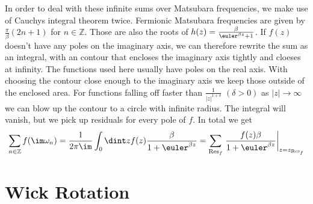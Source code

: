 \documentclass[a4paper,10pt]{report}
\begin{document}
In order to deal with these infinite sums over Matsubara frequencies, we make use of Cauchys integral theorem twice.
Fermionic Matsubara frequencies are given by $\frac{\pi}{\beta}(2n+1)$ for $n \in \mathbb{Z}$.
Those are also the roots of $h(z) = \frac{\beta}{\euler^{\beta z}+1}$.
If $f(z)$ doesn't have any poles on the imaginary axis, we can therefore rewrite the sum as an integral, 
with an contour that encloses the imaginary axis tightly and cloeses at infinity.
The functions used here usually have poles on the real axis. 
With choosing the contour close enough to the imaginary axis we keep those outside of the enclosed area.
For functions falling off faster than $\frac{1}{|z|^{1+\delta}}$ $(\delta>0)$ as $|z|\rightarrow \infty$ we can blow up the contour to a
circle with infinite radius. The integral will vanish, but we pick up residuals for every pole of $f$.
In total we get
\begin{equation}
 \sum_{n\in\mathbb{Z}} f(\im \omega_n) = \frac{1}{2\pi \im} \int_0 \dint z f(z)\frac{\beta}{1+\euler^{\beta z }} 
 = \sum_{\mathrm{Res}_f} \left. \frac{f(z)\beta}{1+\euler^{\beta z }}\right|_{z=z_{\mathrm{Res}_f}}
\end{equation}

\section{Wick Rotation}






\end{document}
